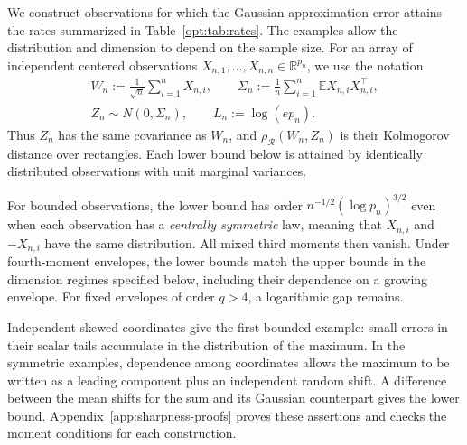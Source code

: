 \documentclass[11pt,letterpaper]{article}
\theoremstyle{remark}
\newcommand{\E}{\mathbb E}
\newcommand{\R}{\mathbb R}
\newcommand{\rh}{\rho_{\mathcal R}}
\begin{document}
We construct observations for which the Gaussian approximation error
attains the rates summarized in Table~\ref{opt:tab:rates}. The examples
allow the distribution and dimension to depend on the sample size.
For an array of independent centered observations
\(X_{n,1},\ldots,X_{n,n}\in\R^{p_n}\), we use the notation
\begin{equation}
\begin{gathered}
 W_n:=\frac1{\sqrt n}\sum_{i=1}^nX_{n,i},\qquad
 \Sigma_n:=\frac1n\sum_{i=1}^n\E X_{n,i}X_{n,i}^{\top},\\
 Z_n\sim N(0,\Sigma_n),\qquad L_n:=\log(ep_n).
\end{gathered}
\label{lower:eq:setup}
\end{equation}
Thus \(Z_n\) has the same covariance as \(W_n\), and
\(\rh(W_n,Z_n)\) is their Kolmogorov distance over rectangles.
Each lower bound below is attained by identically distributed
observations with unit marginal variances.

For bounded observations, the lower bound has order
\(n^{-1/2}(\log p_n)^{3/2}\) even when each observation has a
\emph{centrally symmetric} law, meaning that
\(X_{n,i}\) and \(-X_{n,i}\) have the same distribution.
All mixed third moments then vanish. Under fourth-moment envelopes,
the lower bounds match the upper bounds in the dimension regimes
specified below, including their dependence on a growing envelope.
For fixed envelopes of order \(q>4\), a logarithmic gap remains.

Independent skewed coordinates give the first bounded example:
small errors in their scalar tails accumulate in the distribution of
the maximum. In the symmetric examples, dependence among coordinates
allows the maximum to be written as a leading component plus an
independent random shift. A difference between the mean shifts for
the sum and its Gaussian counterpart gives the lower bound.
Appendix~\ref{app:sharpness-proofs} proves these assertions and checks
the moment conditions for each construction.
\end{document}
